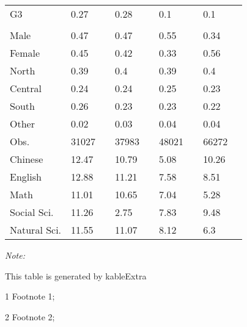 \begin{table}
\begin{threeparttable}
\begin{tabular}[t]{lllllllll}
\hspace{1em}G3 & 0.27 &  & 0.28 &  & 0.1 &  & 0.1 & \\
\addlinespace[0.3em]
\multicolumn{9}{l}{\textit{\textbf{Panel D: Demographic}}}\\
\hspace{1em}Male & 0.47 &  & 0.47 &  & 0.55 &  & 0.34 & \\
\hspace{1em}Female & 0.45 &  & 0.42 &  & 0.33 &  & 0.56 & \\
\hspace{1em}North & 0.39 &  & 0.4 &  & 0.39 &  & 0.4 & \\
\hspace{1em}Central & 0.24 &  & 0.24 &  & 0.25 &  & 0.23 & \\
\hspace{1em}South & 0.26 &  & 0.23 &  & 0.23 &  & 0.22 & \\
\hspace{1em}Other & 0.02 &  & 0.03 &  & 0.04 &  & 0.04 & \\
Obs. & 31027 &  & 37983 &  & 48021 &  & 66272 & \\
Chinese & 12.47 &  & 10.79 &  & 5.08 &  & 10.26 & \\
English & 12.88 &  & 11.21 &  & 7.58 &  & 8.51 & \\
Math & 11.01 &  & 10.65 &  & 7.04 &  & 5.28 & \\
Social Sci. & 11.26 &  & 2.75 &  & 7.83 &  & 9.48 & \\
Natural Sci. & 11.55 &  & 11.07 &  & 8.12 &  & 6.3 & \\
\bottomrule
\end{tabular}
\begin{tablenotes}
\item \textit{Note: } 
\item This table is generated by kableExtra
\item[1] Footnote 1; 
\item[2] Footnote 2; 
\end{tablenotes}
\end{threeparttable}
\end{table}
